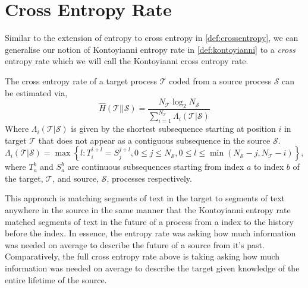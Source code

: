 \section{Cross Entropy Rate}

Similar to the extension of entropy to cross entropy in \autoref{def:crossentropy}, we can generalise our notion of Kontoyianni entropy rate in \autoref{def:kontoyianni} to a \emph{cross} entropy rate which we will call the Kontoyianni cross entropy rate.

\begin{definition}
	The cross entropy rate of a {\color{target} target process} $\mathcal{T}$ coded from a {\color{source} source process} $\mathcal{S}$ can be estimated via,
	\begin{equation}
	\hat{H}(\mathcal{T} || \mathcal{S})=\frac{N_{\mathcal{T}} \log _{2} N_{\mathcal{S}}}{\sum_{i=1}^{N_{\mathcal{T}}} \Lambda_{i}(\mathcal{T}| \mathcal{S})}
	\end{equation}
	Where $\Lambda_{i}(\mathcal{T}| \mathcal{S})$ is given by the shortest subsequence starting at position $i$ in {\color{target}target} $\mathcal{T}$ that does not appear as a contiguous subsequence in the {\color{source}source} $\mathcal{S}$.
	\begin{equation}
	\Lambda_{i}(\mathcal{T}| \mathcal{S}) = \max \left\{l: T_i^{i+l}=S_{j}^{j+l}, 0 \leq j \leq N_{\mathcal{S}},  0 \leq l \leq \min( N_{\mathcal{S}}- j , N_{\mathcal{T}}- i )\right\},
	\end{equation}
	where $T_a^{b}$ and $S_a^b$ are continuous subsequences starting from index $a$ to index $b$ of the {\color{target} target}, $\mathcal{T}$, and  {\color{source} source}, $\mathcal{S}$, processes respectively.
\end{definition}

This approach is matching segments of text in the {\color{target}target} to segments of text anywhere in the {\color{source}source} in the same manner that the Kontoyianni entropy rate matched segments of text in the future of a process from a index to the history before the index. In essence, the entropy rate was asking how much information was needed on average to describe the future of a source from it's past. Comparatively, the full cross entropy rate above is taking asking how much information was needed on average to describe the {\color{target}target} given knowledge of the entire lifetime of the {\color{source}source}. 

